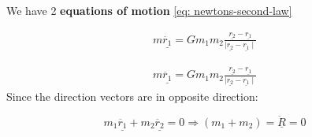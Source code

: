We have 2 {\bf equations of motion} \eqref{eq: newtons-second-law}

\begin{align*}
  m\underline{\ddot{r_{1}}} = Gm_{1}m_{2}\frac{ \underline{r_{2}} - \underline{r_{1}}}{ \mid \underline{r_{2}} - \underline{r_{1}} \mid} \label{eq:
  two-body-grav-1} \tag{G1}
\end{align*}

\begin{align*}
  m\underline{\ddot{r_{1}}} = Gm_{1}m_{2}\frac{ \underline{r_{2}} - \underline{r_{1}}}{ \mid \underline{r_{2}} - \underline{r_{1}} \mid} \label{eq:
  two-body-grav-2} \tag{G2}
\end{align*}
Since the direction vectors are in opposite direction:

$$m_{1}\underline{\ddot{r_{1}}} + m_{2} \underline{\ddot{r_{2}}} = 0 \Rightarrow (m_{1} + m_{2}) = \underline{\ddot{R}} = 0$$

